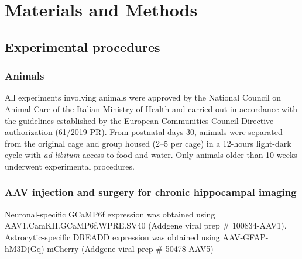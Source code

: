 
\chapter{Materials and Methods} %

\label{Chapter3} %

\section{Experimental procedures}
\label{chap3:sec:1:exp_proc}
\subsection{Animals}
All experiments involving animals were approved by the National Council on Animal Care of the Italian Ministry of Health and carried out in accordance with the guidelines established by the European Communities Council Directive authorization (61/2019-PR). 
From postnatal days 30, animals were separated from the original cage and group housed (2–5 per cage) in a 12-hours light-dark cycle with \textit{ad libitum} access to food and water. 
Only animals older than 10 weeks underwent experimental procedures. 

\subsection{AAV injection and surgery for chronic hippocampal imaging}
\label{chap3:sec:1:subsec2:AAV_injection}
Neuronal-specific GCaMP6f expression was obtained using AAV1.CamKII.GCaMP6f.WPRE.SV40 (Addgene viral prep \# 100834-AAV1).
Astrocytic-specific DREADD expression was obtained using AAV-GFAP-hM3D(Gq)-mCherry (Addgene viral prep \# 50478-AAV5)


